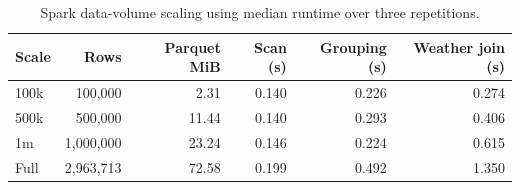 \begin{table}[htbp]
\centering
\caption{Spark data-volume scaling using median runtime over three repetitions.}
\label{tab:data-volume-scaling}
\begin{tabular}{lrrrrr}
\toprule
Scale & Rows & Parquet MiB & Scan (s) & Grouping (s) & Weather join (s) \\
\midrule
100k & 100,000 & 2.31 & 0.140 & 0.226 & 0.274 \\
500k & 500,000 & 11.44 & 0.140 & 0.293 & 0.406 \\
1m & 1,000,000 & 23.24 & 0.146 & 0.224 & 0.615 \\
Full & 2,963,713 & 72.58 & 0.199 & 0.492 & 1.350 \\
\bottomrule
\end{tabular}
\end{table}
